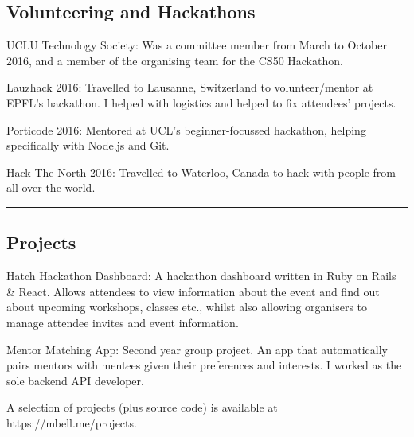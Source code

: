 \documentclass[11pt,a4paper]{article}
\newenvironment{indentsection}[1]%
{\begin{list}{}%
	{\setlength{\leftmargin}{#1}}%
	\item[]%
}
{\end{list}}
\begin{document}
\subsection*{Volunteering and Hackathons}
\begin{indentsection}{\parindent}
\begin{description*}
	\item[UCLU Technology Society:] Was a committee member from March to October 2016, and a member of the organising team for the CS50 Hackathon.
	\item[Lauzhack 2016:] Travelled to Lausanne, Switzerland to volunteer/mentor at EPFL's hackathon. I helped with logistics and helped to fix attendees' projects.
	\item[Porticode 2016:] Mentored at UCL's beginner-focussed hackathon, helping specifically with Node.js and Git.
	\item[Hack The North 2016:] Travelled to Waterloo, Canada to hack with people from all over the world.
\end{description*}
\end{indentsection}
\vspace{-0.4em}
\hrule

\vspace{-1.2em}
\subsection*{Projects}
\begin{indentsection}{\parindent}
	\begin{description*}
		\item[Hatch Hackathon Dashboard:]
		    A hackathon dashboard written in Ruby on Rails \& React. Allows attendees to view information about the event and find out about upcoming workshops, classes etc., whilst also allowing organisers to manage attendee invites and event information.
		\item[Mentor Matching App:]
		Second year group project. An app that automatically pairs mentors with mentees given their preferences and interests. I worked as the sole backend API developer.
	\end{description*}
	A selection of projects (plus source code) is available at https://mbell.me/projects.
\end{indentsection}
\end{document}
